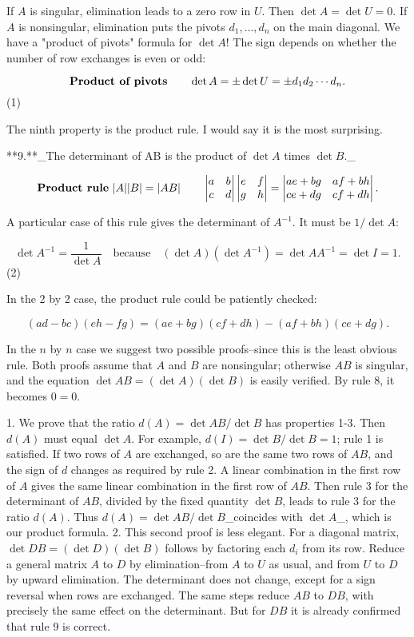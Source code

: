 If \(A\) is singular, elimination leads to a zero row in \(U\). Then \(\det A=\det U=0\). If \(A\) is nonsingular, elimination puts the pivots \(d_{1},\ldots,d_{n}\) on the main diagonal. We have a "product of pivots" formula for \(\det A\)! The sign depends on whether the number of row exchanges is even or odd:

\[\mbox{\bf Product of pivots}\qquad\det A=\pm\det U=\pm d_{1}d_{2}\cdots d_{n}.\] (1)

The ninth property is the product rule. I would say it is the most surprising.

**9.**_The determinant of AB is the product of \(\det A\) times \(\det B\)._

\[\mbox{\bf Product rule}\ |A||B|=|AB|\qquad\begin{vmatrix}a&b\\ c&d\end{vmatrix}\begin{vmatrix}e&f\\ g&h\end{vmatrix}=\begin{vmatrix}ae+bg&af+bh\\ ce+dg&cf+dh\end{vmatrix}.\]

A particular case of this rule gives the determinant of \(A^{-1}\). It must be \(1/\det A\):

\[\det A^{-1}=\frac{1}{\det A}\quad\mbox{because}\quad(\det A)(\det A^{-1})=\det AA ^{-1}=\det I=1.\] (2)

In the 2 by 2 case, the product rule could be patiently checked:

\[(ad-bc)(eh-fg)=(ae+bg)(cf+dh)-(af+bh)(ce+dg).\]

In the \(n\) by \(n\) case we suggest two possible proofs--since this is the least obvious rule. Both proofs assume that \(A\) and \(B\) are nonsingular; otherwise \(AB\) is singular, and the equation \(\det AB=(\det A)(\det B)\) is easily verified. By rule 8, it becomes \(0=0\).

1. We prove that the ratio \(d(A)=\det AB/\det B\) has properties 1-3. Then \(d(A)\) must equal \(\det A\). For example, \(d(I)=\det B/\det B=1\); rule 1 is satisfied. If two rows of \(A\) are exchanged, so are the same two rows of \(AB\), and the sign of \(d\) changes as required by rule 2. A linear combination in the first row of \(A\) gives the same linear combination in the first row of \(AB\). Then rule 3 for the determinant of \(AB\), divided by the fixed quantity \(\det B\), leads to rule 3 for the ratio \(d(A)\). Thus \(d(A)=\det AB/\det B\)_coincides with \(\det A\)_, which is our product formula.
2. This second proof is less elegant. For a diagonal matrix, \(\det DB=(\det D)(\det B)\) follows by factoring each \(d_{i}\) from its row. Reduce a general matrix \(A\) to \(D\) by elimination--from \(A\) to \(U\) as usual, and from \(U\) to \(D\) by upward elimination. The determinant does not change, except for a sign reversal when rows are exchanged. The same steps reduce \(AB\) to \(DB\), with precisely the same effect on the determinant. But for \(DB\) it is already confirmed that rule 9 is correct.


